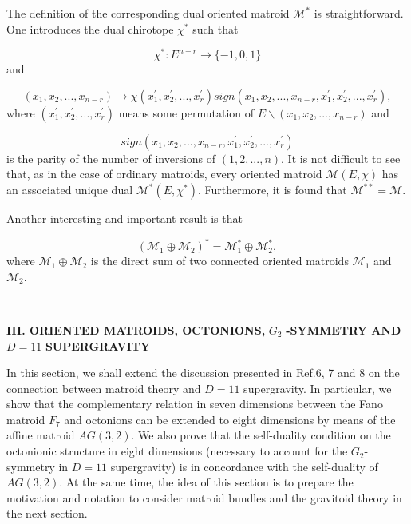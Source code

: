 \documentclass[a4paper,12pt]{article}
\begin{document}
The definition of the corresponding dual oriented matroid $\mathcal{M}^{\ast
}$ is straightforward. One introduces the dual chirotope $\chi ^{\ast }$
such that

\begin{equation}
\chi ^{\ast }:E^{n-r}\rightarrow \{-1,0,1\}  \label{5}
\end{equation}
and

\begin{equation}
(x_{1},x_{2},...,x_{n-r})\rightarrow \chi (x_{1}^{\prime },x_{2}^{\prime
},...,x_{r}^{\prime })sign(x_{1},x_{2},...,x_{n-r},x_{1}^{\prime
},x_{2}^{\prime },...,x_{r}^{\prime }),  \label{6}
\end{equation}
where $(x_{1}^{\prime },x_{2}^{\prime },...,x_{r}^{\prime })$ means some
permutation of $E\backslash (x_{1},x_{2},...,x_{n-r})$ and

\[
sign(x_{1},x_{2},...,x_{n-r},x_{1}^{\prime },x_{2}^{\prime
},...,x_{r}^{\prime }) 
\]
is the parity of the number of inversions of $(1,2,...,n).$ It is not
difficult to see that, as in the case of ordinary matroids, every oriented
matroid $\mathcal{M}(E,\chi )$ has an associated unique dual $\mathcal{M}%
^{\ast }(E,\chi ^{\ast }).$ Furthermore, it is found that $\mathcal{M}^{\ast
\ast }=\mathcal{M}$.

Another interesting and important result is that

\begin{equation}
(\mathcal{M}_{1}\oplus \mathcal{M}_{2})^{\ast }=\mathcal{M}_{1}^{\ast
}\oplus \mathcal{M}_{2}^{\ast },  \label{7}
\end{equation}
where $\mathcal{M}_{1}\oplus \mathcal{M}_{2}$ is the direct sum of two
connected oriented matroids $\mathcal{M}_{1}$ and $\mathcal{M}_{2}$.

\bigskip

\smallskip\ 

\noindent \textbf{III. ORIENTED MATROIDS, OCTONIONS, }$G_{2}$\textbf{%
-SYMMETRY AND }$D=11$ \textbf{SUPERGRAVITY}

\bigskip

In this section, we shall extend the discussion presented in Ref.6, 7 and 8
on the connection between matroid theory and $D=11$ supergravity. In
particular, we show that the complementary relation in seven dimensions
between the Fano matroid $F_{7}$ and octonions can be extended to eight
dimensions by means of the affine matroid $AG(3,2)$. We also prove that the
self-duality condition on the octonionic structure in eight dimensions
(necessary to account for the $G_{2}$-symmetry in $D=11$ supergravity) is in
concordance with the self-duality of $AG(3,2)$. At the same time, the idea
of this section is to prepare the motivation and notation to consider
matroid bundles and the gravitoid theory in the next section.
\end{document}
